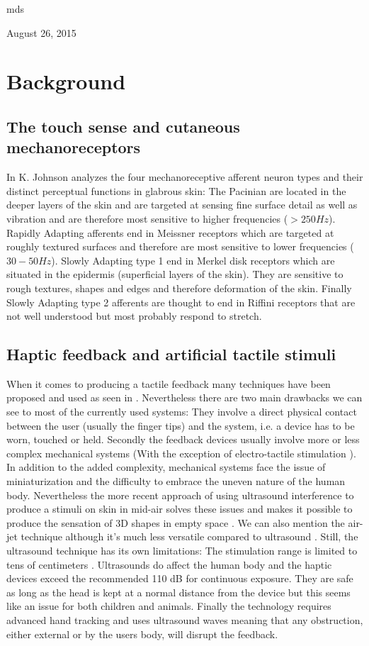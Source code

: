 \documentclass[10pt,journal,compsoc]{IEEEtran}
\begin{document}
\hfill mds
 
\hfill August 26, 2015

\section{Background}
	\subsection{The touch sense and cutaneous mechanoreceptors}
	In \cite{johnson2001con} K. Johnson analyzes the four mechanoreceptive  afferent  neuron types and their distinct perceptual functions in glabrous skin: 
	The Pacinian are located in the deeper layers of the skin and are targeted at sensing fine surface detail as well as vibration and are therefore most sensitive to higher frequencies ($>250Hz$).
	Rapidly Adapting afferents end in Meissner receptors which are targeted at roughly textured surfaces and therefore are most sensitive to lower frequencies ($30-50Hz$).
	Slowly Adapting type 1 end in Merkel disk receptors which are situated in the epidermis (superficial layers of the skin). They are sensitive to rough textures, shapes and edges and therefore deformation of the skin.
	Finally Slowly Adapting type 2 afferents are thought to end in Riffini receptors that are not well understood but most probably respond to stretch.
	
	\subsection{Haptic feedback and artificial tactile stimuli}
	When it comes to producing a tactile feedback many techniques have been proposed and used as seen in \cite{benali2004isr}. Nevertheless there are two main drawbacks we can see to most of the currently used systems:
	They involve a direct physical contact between the user (usually the finger tips) and the system, i.e. a device has to be worn, touched or held.
	Secondly the feedback devices usually involve more or less complex mechanical systems (With the exception of electro-tactile stimulation \cite{kaezmarek1991tbe}). In addition to the added complexity, mechanical systems face the issue of miniaturization and the difficulty to embrace the uneven nature of the human body.
	Nevertheless the more recent approach of using ultrasound interference to produce a stimuli on skin in mid-air \cite{carter2013uist} solves these issues and makes it possible to produce the sensation of 3D shapes in empty space \cite{sasia2014acm}. We can also mention the air-jet technique although it's much less versatile compared to ultrasound \cite{arafsha2015book}. Still, the ultrasound technique has its own limitations:
	The stimulation range is limited to tens of centimeters \cite{long2014acm}.
	Ultrasounds do affect the human body and the haptic devices exceed the recommended 110 dB for continuous exposure. They are safe as long as the head is kept at a normal distance from the device \cite{long2014acm} but this seems like an issue for both children and animals.
	Finally the technology requires advanced hand tracking and uses ultrasound waves meaning that any obstruction, either external or by the users body, will disrupt the feedback.
	
\end{document}
